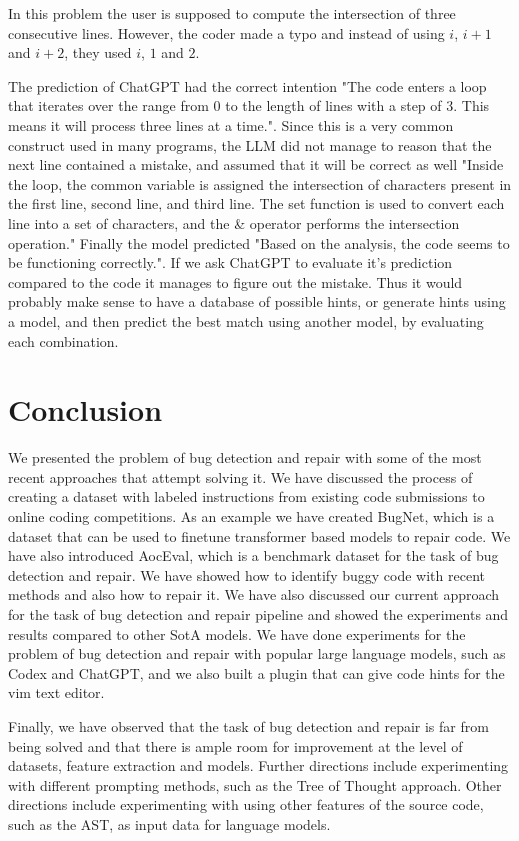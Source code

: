 \documentclass[12pt,a4paper]{report}
\begin{document}
In this problem the user is supposed to compute the intersection of three consecutive lines. However, the coder made a typo and instead of using $i$, $i+1$ and $i+2$, they used $i$, $1$ and $2$. 

The prediction of ChatGPT had the correct intention "The code enters a loop that iterates over the range from 0 to the length of lines with a step of 3. This means it will process three lines at a time.". Since this is a very common construct used in many programs, the LLM did not manage to reason that the next line contained a mistake, and assumed that it will be correct as well "Inside the loop, the common variable is assigned the intersection of characters present in the first line, second line, and third line. The set function is used to convert each line into a set of characters, and the \& operator performs the intersection operation." Finally the model predicted "Based on the analysis, the code seems to be functioning correctly.". If we ask ChatGPT to evaluate it's prediction compared to the code it manages to figure out the mistake. Thus it would probably make sense to have a database of possible hints, or generate hints using a model, and then predict the best match using another model, by evaluating each combination.

\chapter{Conclusion}

We presented the problem of bug detection and repair with some of the most recent approaches that attempt solving it. We have discussed the process of creating a dataset with labeled instructions from existing code submissions to online coding competitions. As an example we have created BugNet, which is a dataset that can be used to finetune transformer based models to repair code. We have also introduced AocEval, which is a benchmark dataset for the task of bug detection and repair. We have showed how to identify buggy code with recent methods and also how to repair it. We have also discussed our current approach for the task of bug detection and repair pipeline and showed the experiments and results compared to other SotA models. We have done experiments for the problem of bug detection and repair with popular large language models, such as Codex and ChatGPT, and we also built a plugin that can give code hints for the vim text editor.

Finally, we have observed that the task of bug detection and repair is far from being solved and that there is ample room for improvement at the level of datasets, feature extraction and models. Further directions include experimenting with different prompting methods, such as the Tree of Thought approach. Other directions include experimenting with using other features of the source code, such as the AST, as input data for language models.
\end{document}
